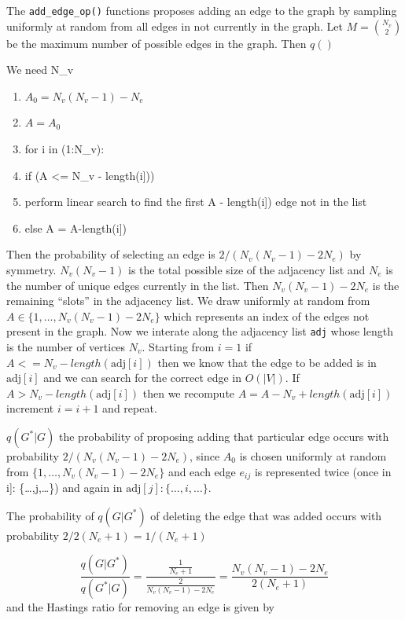 \documentclass[11pt,a4paper]{article}
\providecommand{\tightlist}{%
  \setlength{\itemsep}{0pt}\setlength{\parskip}{0pt}}
\numberwithin{equation}{section}
\begin{document}
The \texttt{add\_edge\_op()} functions proposes adding an edge to the
graph by sampling uniformly at random from all edges in not currently in
the graph. Let \(M = \binom{N_v}{2}\) be the maximum number of possible
edges in the graph. Then \(q()\)

We need N\_v

\begin{enumerate}
\def\labelenumi{\arabic{enumi}.}
\tightlist
\item
  \(A_0 = N_v(N_v-1) - N_e\)
\item
  \(A = A_0\)
\item
  for i in (1:N\_v):
\item
  if (A \textless{}= N\_v - length(\text{adj}{[}i{]}))
\item
  perform linear search to find the first A - length(\text{adj}{[}i{]})
  edge not in the list
\item
  else A = A-length(\text{adj}{[}i{]})
\end{enumerate}

Then the probability of selecting an edge is \(2/(N_v(N_v-1) - 2N_e)\)
by symmetry. \(N_v(N_v-1)\) is the total possible size of the adjacency
list and \(N_e\) is the number of unique edges currently in the list.
Then \(N_v(N_v-1) - 2N_e\) is the remaining ``slots'' in the adjacency
list. We draw uniformly at random from
\(A \in \{1,\dots,N_v(N_v-1) - 2N_e\}\) which represents an index of the
edges not present in the graph. Now we interate along the adjacency list
\texttt{adj} whose length is the number of vertices \(N_v\). Starting
from \(i = 1\) if \(A <= N_v - length(\text{adj}[i])\) then we know that
the edge to be added is in \(\text{adj}[i]\) and we can search for the
correct edge in \(O(|V|)\). If \(A > N_v - length(\text{adj}[i])\) then
we recompute \(A = A - N_v + length(\text{adj}[i])\) increment
\(i = i + 1\) and repeat.

\(q(G^*|G)\) the probability of proposing adding that particular edge
occurs with probability \(2/(N_v(N_v-1) - 2N_e)\), since \(A_0\) is
chosen uniformly at random from \(\{1,\dots,N_v(N_v-1) - 2N_e\}\) and
each edge \(e_{ij}\) is represented twice (once in \text{adj}{[}i{]}:
\{\dots,j,\dots\}) and again in \(\text{adj}[j]: \{\dots,i,\dots\}\).

The probability of \(q(G|G^*)\) of deleting the edge that was added
occurs with probability \(2/2(N_e+1) = 1/(N_e+1)\)

\[\frac{q(G|G^*)}{q(G^*|G)} = \frac{\frac{1}{N_e+1}}{\frac{2}{N_v(N_v-1) - 2N_e}} = \frac{N_v(N_v-1) - 2N_e}{2(N_e+1)} \]
and the Hastings ratio for removing an edge is given by
\end{document}
